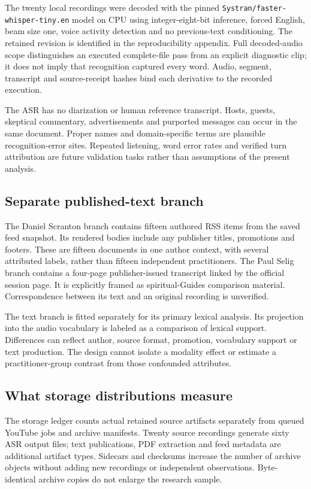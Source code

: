 The twenty local recordings were decoded with the pinned \texttt{Systran/faster-whisper-tiny.en} model on CPU using integer-eight-bit inference, forced English, beam size one, voice activity detection and no previous-text conditioning. The retained revision is identified in the reproducibility appendix. Full decoded-audio scope distinguishes an executed complete-file pass from an explicit diagnostic clip; it does not imply that recognition captured every word. Audio, segment, transcript and source-receipt hashes bind each derivative to the recorded execution.

The ASR has no diarization or human reference transcript. Hosts, guests, skeptical commentary, advertisements and purported messages can occur in the same document. Proper names and domain-specific terms are plausible recognition-error sites. Repeated listening, word error rates and verified turn attribution are future validation tasks rather than assumptions of the present analysis.

\subsection{Separate published-text branch}
The Daniel Scranton branch contains fifteen authored RSS items from the saved feed snapshot. Its rendered bodies include any publisher titles, promotions and footers. These are fifteen documents in one author context, with several attributed labels, rather than fifteen independent practitioners. The Paul Selig branch contains a four-page publisher-issued transcript linked by the official session page. It is explicitly framed as spiritual-Guides comparison material. Correspondence between its text and an original recording is unverified.

The text branch is fitted separately for its primary lexical analysis. Its projection into the audio vocabulary is labeled as a comparison of lexical support. Differences can reflect author, source format, promotion, vocabulary support or text production. The design cannot isolate a modality effect or estimate a practitioner-group contrast from those confounded attributes.

\subsection{What storage distributions measure}
The storage ledger counts actual retained source artifacts separately from queued YouTube jobs and archive manifests. Twenty source recordings generate sixty ASR output files; text publications, PDF extraction and feed metadata are additional artifact types. Sidecars and checksums increase the number of archive objects without adding new recordings or independent observations. Byte-identical archive copies do not enlarge the research sample.


